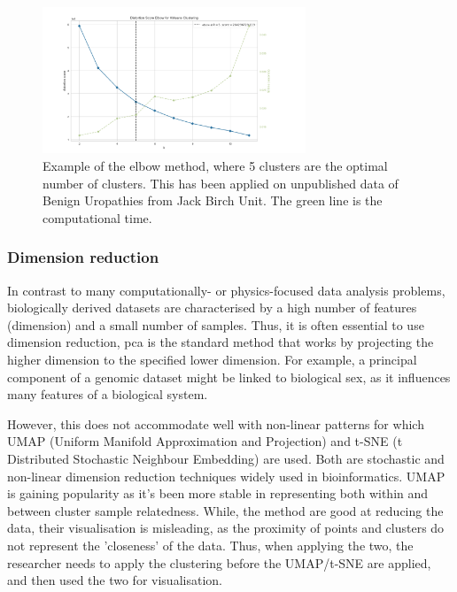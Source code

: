 \begin{figure}[!htb]
  \centering\includegraphics[width=0.7\textwidth,height=0.5\textheight,keepaspectratio]{Sections/Lit_review/Resources/elbow_method.png}
    \caption{Example of the elbow method, where 5 clusters are the optimal number of clusters. This has been applied on unpublished data of Benign Uropathies from Jack Birch Unit. The green line is the computational time. }
    \label{fig:elbow_method}
\end{figure}
\FloatBarrier


\subsubsection{Dimension reduction} \label{s:lit:dim_red}

In contrast to many computationally- or physics-focused data analysis problems, biologically derived datasets are characterised by a high number of features (dimension) and a small number of samples. Thus, it is often essential to use dimension reduction, \acrfull{pca} is the standard method that works by projecting the higher dimension to the specified lower dimension. For example, a principal component of a genomic dataset might be linked to biological sex, as it influences many features of a biological system.

However, this does not accommodate well with non-linear patterns for which UMAP (Uniform Manifold Approximation and Projection) and t-SNE (t Distributed Stochastic Neighbour Embedding) are used. Both are stochastic and non-linear dimension reduction techniques widely used in bioinformatics. UMAP is gaining popularity as it's been more stable in representing both within and between cluster sample relatedness. While, the method are good at reducing the data, their visualisation is misleading, as the proximity of points and clusters do not represent the 'closeness' of the data. Thus, when applying the two, the researcher needs to apply the clustering before the UMAP/t-SNE are applied, and then used the two for visualisation.

